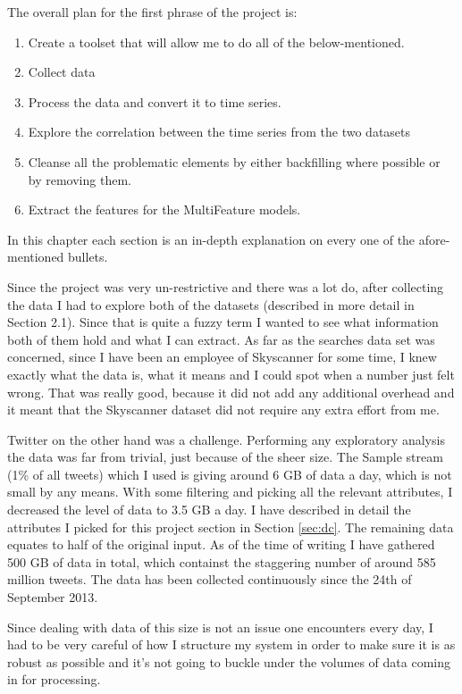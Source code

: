 \documentclass[minf,twoside,singlespacing,parskip,frontabs]{infthesis}
\begin{document}
The overall plan for the first phrase of the project is:
\begin{enumerate}
\item Create a toolset that will allow me to do all of the below-mentioned.
\item Collect data
\item Process the data and convert it to time series.
\item Explore the correlation between the time series from the two datasets
\item Cleanse all the problematic elements by either backfilling where possible or by removing them.
\item Extract the features for the MultiFeature models.
\end{enumerate}

In this chapter each section is an in-depth explanation on every one of the afore-mentioned bullets. 

Since the project was very un-restrictive and there was a lot do, after collecting the data I had  to explore both of the datasets (described in more detail in Section 2.1). Since that is quite a fuzzy term I wanted to see what information both of them hold and what I can extract. As far as the searches data set was concerned, since I have been an employee of Skyscanner for some time, I knew exactly what the data is, what it means and I could spot when a number just felt wrong. That was really good, because it did not add any additional overhead and it meant that the Skyscanner dataset did not require any extra effort from me. 


Twitter on the other hand was a challenge. Performing any exploratory analysis the data was far from trivial, just because of the sheer size. The Sample stream (1\% of all tweets) \cite{samplestream} which I used is giving around 6 GB of data a day, which is not small by any means. With some filtering and picking all the relevant attributes, I decreased the level of data to 3.5 GB a day. I have described in detail the attributes I picked for this project section in Section \ref{sec:dc}. The remaining data equates to half of the original input. As of the time of writing I have gathered 500 GB of data in total, which containst the staggering number of around 585 million tweets. The data has been collected continuously since the 24th of September 2013. 


Since dealing with data of this size is not an issue one encounters every day, I had to be very careful of how I structure my system in order to make sure it is as robust as possible and it's not going to buckle under the volumes of data coming in for processing. 
\end{document}
